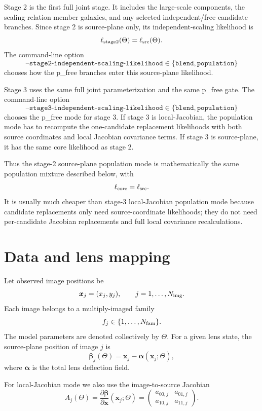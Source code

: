 \documentclass[11pt]{article}
\begin{document}
Stage 2 is the first full joint stage. It includes the large-scale components,
the scaling-relation member galaxies, and any selected independent/free
candidate branches. Since stage 2 is source-plane only, its independent-scaling
likelihood is
\[
    \ell_{\rm stage2}(\Theta)
    =
    \ell_{\rm src}(\Theta).
\]
The command-line option
\[
    \texttt{--stage2-independent-scaling-likelihood}
    \in \{\texttt{blend},\texttt{population}\}
\]
chooses how the p\_free branches enter this source-plane likelihood.

Stage 3 uses the same full joint parameterization and the same p\_free gate.
The command-line option
\[
    \texttt{--stage3-independent-scaling-likelihood}
    \in \{\texttt{blend},\texttt{population}\}
\]
chooses the p\_free mode for stage 3. If stage 3 is local-Jacobian, the
population mode has to recompute the one-candidate replacement likelihoods
with both source coordinates and local Jacobian covariance terms. If stage 3
is source-plane, it has the same core likelihood as stage 2.

Thus the stage-2 source-plane population mode is mathematically the same
population mixture described below, with
\[
    \ell_{\rm core}=\ell_{\rm src}.
\]
It is usually much cheaper than stage-3 local-Jacobian population mode because
candidate replacements only need source-coordinate likelihoods; they do not
need per-candidate Jacobian replacements and full local covariance
recalculations.

\section{Data and lens mapping}

Let observed image positions be
\[
    \bm{x}_j = (x_j, y_j), \qquad j = 1,\ldots,N_{\rm img}.
\]
Each image belongs to a multiply-imaged family
\[
    f_j \in \{1,\ldots,N_{\rm fam}\}.
\]
The model parameters are denoted collectively by $\Theta$. For a given lens
state, the source-plane position of image $j$ is
\[
    \bm{\beta}_j(\Theta) =
    \bm{x}_j - \bm{\alpha}(\bm{x}_j;\Theta),
\]
where $\bm{\alpha}$ is the total lens deflection field.

For local-Jacobian mode we also use the image-to-source Jacobian
\[
    A_j(\Theta) =
    \frac{\partial \bm{\beta}}{\partial \bm{x}}(\bm{x}_j;\Theta)
    =
    \begin{pmatrix}
    a_{00,j} & a_{01,j}\\
    a_{10,j} & a_{11,j}
    \end{pmatrix}.
\]
\end{document}
